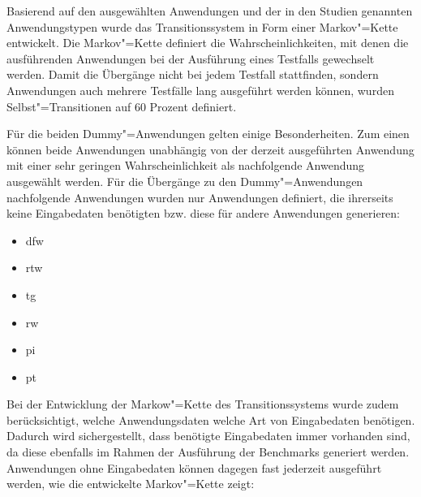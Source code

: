 Basierend auf den ausgewählten Anwendungen und der in den Studien genannten Anwendungstypen wurde das Transitionssystem in Form einer Markov"=Kette entwickelt.
Die Markov"=Kette definiert die Wahrscheinlichkeiten, mit denen die ausführenden Anwendungen bei der Ausführung eines Testfalls gewechselt werden.
Damit die Übergänge nicht bei jedem Testfall stattfinden, sondern Anwendungen auch mehrere Testfälle lang ausgeführt werden können, wurden Selbst"=Transitionen auf 60 Prozent definiert.

Für die beiden Dummy"=Anwendungen gelten einige Besonderheiten.
Zum einen können beide Anwendungen unabhängig von der derzeit ausgeführten Anwendung mit einer sehr geringen Wahrscheinlichkeit als nachfolgende Anwendung ausgewählt werden.
Für die Übergänge zu den Dummy"=Anwendungen nachfolgende Anwendungen wurden nur Anwendungen definiert, die ihrerseits keine Eingabedaten benötigten bzw. diese für andere Anwendungen generieren:

\begin{itemize}
    \item \acl{dfw}
    \item \acl{rtw}
    \item \acl{tg}
    \item \acl{rw}
    \item \acl{pi}
    \item \acl{pt}
\end{itemize}

Bei der Entwicklung der Markow"=Kette des Transitionssystems wurde zudem berücksichtigt, welche Anwendungsdaten welche Art von Eingabedaten benötigen.
Dadurch wird sichergestellt, dass benötigte Eingabedaten immer vorhanden sind, da diese ebenfalls im Rahmen der Ausführung der Benchmarks generiert werden.
Anwendungen ohne Eingabedaten können dagegen fast jederzeit ausgeführt werden, wie die entwickelte Markov"=Kette zeigt:

